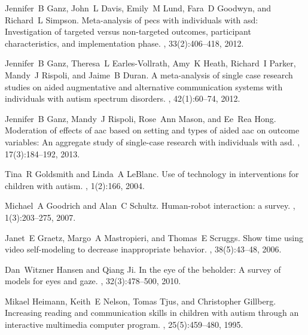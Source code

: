 \documentclass{ut-thesis}
\begin{document}
\begin{thebibliography}{100}
Jennifer~B Ganz, John~L Davis, Emily~M Lund, Fara~D Goodwyn, and Richard~L
  Simpson.
\newblock Meta-analysis of pecs with individuals with asd: Investigation of
  targeted versus non-targeted outcomes, participant characteristics, and
  implementation phase.
, 33(2):406--418, 2012.

Jennifer~B Ganz, Theresa~L Earles-Vollrath, Amy~K Heath, Richard~I Parker,
  Mandy~J Rispoli, and Jaime~B Duran.
\newblock A meta-analysis of single case research studies on aided augmentative
  and alternative communication systems with individuals with autism spectrum
  disorders.
, 42(1):60--74,
  2012.

Jennifer~B Ganz, Mandy~J Rispoli, Rose~Ann Mason, and Ee~Rea Hong.
\newblock Moderation of effects of aac based on setting and types of aided aac
  on outcome variables: An aggregate study of single-case research with
  individuals with asd.
, 17(3):184--192, 2013.

Tina~R Goldsmith and Linda~A LeBlanc.
\newblock Use of technology in interventions for children with autism.
, 1(2):166,
  2004.

Michael~A Goodrich and Alan~C Schultz.
\newblock Human-robot interaction: a survey.
,
  1(3):203--275, 2007.

Janet~E Graetz, Margo~A Mastropieri, and Thomas~E Scruggs.
\newblock Show time using video self-modeling to decrease inappropriate
  behavior.
, 38(5):43--48, 2006.

Dan~Witzner Hansen and Qiang Ji.
\newblock In the eye of the beholder: A survey of models for eyes and gaze.
, 32(3):478--500, 2010.

Mikael Heimann, Keith~E Nelson, Tomas Tjus, and Christopher Gillberg.
\newblock Increasing reading and communication skills in children with autism
  through an interactive multimedia computer program.
, 25(5):459--480,
  1995.


\end{thebibliography}
\end{document}

